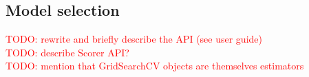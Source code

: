 \documentclass{llncs}
\begin{document}


\subsection{Model selection}

\textcolor{red}{TODO: rewrite and briefly describe the API (see user guide)}\\
\textcolor{red}{TODO: describe Scorer API?}\\
\textcolor{red}{TODO: mention that GridSearchCV objects are themselves estimators}
\end{document}
